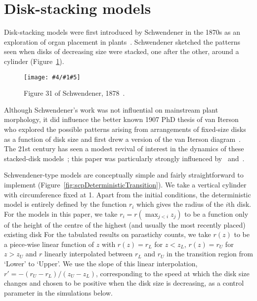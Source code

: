 \documentclass[a4paper,10pt]{amsart}
\newlength{\jfigwidth}
\newcommand{\jpgfig}[3]{\jdofig{#1}{#2}{#3}{Figures}{.jpg}}
\newcommand{\jdofig}[5]{
	\begin{figure}\centering\texttt{[image: \#4/\#1\#5]} \caption{#2}\label{fig:#1}\end{figure}
}
\begin{document}
\section{Disk-stacking models}



 Disk-stacking models were first introduced by Schwendener in the 1870s as an exploration of organ placement in plants~\cite{schwendenerMechanischeTheorieBlattstellungen1878}.  Schwendener sketched the patterns seen when disks of decreasing size were stacked, one after the other, around a cylinder (Figure~\ref{fig:schwendener1878}).%
\jpgfig{schwendener1878}{Figure 31 of Schwendener, 1878~\cite{schwendenerMechanischeTheorieBlattstellungen1878}. 
}{.6}
%
Although Schwendener's work was not influential on mainstream plant morphology, it did influence the better known 1907 PhD thesis of van Iterson who explored the possible patterns arising from arrangements of fixed-size disks as a function of disk size and first drew a version of the van Iterson diagram~\cite{vanitersonjrMathematischeUndMikroscopischAnatomische1907,	schouteUberPseudokonchoiden1913}.
 The 21st century has seen a modest revival of interest in the dynamics of these stacked-disk models~\cite{
	atelaRhombicTilingsPrimordia2017,
	hottonPossibleActualPhyllotaxis2006,
	atelaGeometricDynamicEssence2011};  this paper was particularly strongly influenced by~\cite{goleFibonacciQuasisymmetricPhyllotaxis2016} and~\cite{goleConvergenceDiskStacking2020}. 	

Schwendener-type models are conceptually simple and fairly straightforward to implement (Figure~\ref{fig:scpDeterministicTransition}).
 We take a vertical cylinder with circumference fixed at 1. Apart from the initial conditions, the deterministic model is entirely defined by the function $r_i$ which gives the radius of the $i$th disk.
 For the models in this paper, we take  $r_i=r(\max_{j<i} z_j)$ to be  a function only of the height of the centre of the highest (and usually the most recently placed) existing disk
 For the tabulated results on parastichy counts, we take  $r(z)$ to be a piece-wise linear function of $z$ with $r(z)=r_L$ for $z<z_L$, $r(z)=r_U$ for $z>z_U$ and $r$ linearly interpolated between $r_L$ and  $r_U$ in the transition region from `Lower' to `Upper'. We use the slope of this linear interpolation, $r'= -(r_U-r_L)/(z_U-z_L)$, corresponding to the speed at which the disk size changes and chosen to be positive when the disk size is decreasing, as a control parameter in the simulations below.
\end{document}
